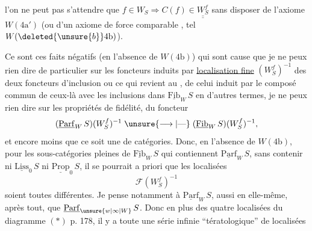 l'on ne peut pas s'attendre que $f\in W_S\Rightarrow C(f)\in\underline{\underline{W_S^f}}$
sans disposer de l'axiome $W(4\mathrm{a}')$ (ou d'un
axiome de force comparable \deleted{\unsure{)}}, tel $W(\deleted{\unsure{b}}4\mathrm{b})$).

Ce sont ces faits  négatifs (en l'absence
de $W(4\mathrm{b})$) qui sont cause que je ne peux rien
dire de particulier sur les foncteurs induits
par \uline{localisation fine} $(W_S^f)^{-1}$ des deux foncteurs
d'inclusion
ou ce qui revient au , de celui induit par le
composé commun de ceux-là avec les inclusions
dans $\underline{\mathrm{Fib}}_W\,S$
en d'autres termes, je ne peux rien dire sur
les propriétés de fidélité,  du foncteur
\[
(\underline{\mathrm{Parf}}_W\,S)(W_S^f)^{-1}\mathrel{\unsure{\longrightarrow|\text{---}}}
(\underline{\mathrm{Fib}}_W\,S)(W_S^f)^{-1},
\]
et encore moins que ce soit une  de
catégories. Donc, en l'absence de $W(4\mathrm{b})$,
pour les sous-catégories pleines  de $\underline{\mathrm{Fib}}_W\,S$ qui
contiennent $\underline{\mathrm{Parf}}_W\,S$, sans contenir ni $\underline{\mathrm{Liss}}_0\,S$ ni
$\underline{\mathrm{Prop}}_0\,S$, il se pourrait a priori que les
localisées
\[
\mathcal{F}(W_S^f)^{-1}
\]
soient toutes différentes. Je pense notamment
à $\underline{\mathrm{Parf}}_W\,S$, aussi  en elle-même, après
tout, que $\underline{\mathrm{Parf}}_{\unsure{w|\infty|W}}\,S$. Donc en plus des quatre
localisées du diagramme $(*)$ p. 178, il y a toute
une série infinie ``tératologique'' de localisées
